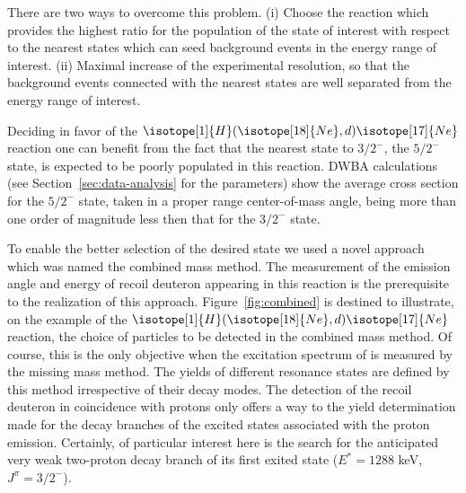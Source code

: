 \documentclass[superscriptaddress,showpacs,showkeys,twoside,floatfix,twocolumn]
{revtex4-1}
\begin{document}
There are two ways to overcome this problem.
(i) Choose the reaction which provides the highest ratio for the population of
the state of interest with respect to the nearest states which can seed
background events in the energy range of interest.
(ii) Maximal increase of the experimental resolution,
so that the background events connected with the nearest states
are well separated from the energy range of interest.

Deciding in favor of the
\(\isotope[1]{H}(\isotope[18]{Ne},d)\isotope[17]{Ne}\) reaction
one can benefit from the fact that the nearest state to $3/2^-$,
the $5/2^-$ state, is expected to be poorly populated
in this reaction.
DWBA calculations (see Section~\ref{sec:data-analysis} for the parameters)
show the average cross section for the $5/2^-$ state,
taken in a proper range center-of-mass angle,
being more than one order of magnitude
less then that for the $3/2^-$ state.

To enable the better selection of the desired  state
we used a novel approach which was named the combined mass method.
The measurement of the emission angle and energy of recoil deuteron appearing
in this reaction is the prerequisite to the realization of this approach.
Figure~\ref{fig:combined} is destined to illustrate, on the example of
the \(\isotope[1]{H}(\isotope[18]{Ne},d)\isotope[17]{Ne}\) reaction,
the choice of particles to be detected in the combined mass method.
Of course, this is the only objective when the excitation spectrum
of  is measured by the missing mass method.
The yields of different resonance states are defined by this method
irrespective of their decay modes.
The detection of the recoil deuteron in coincidence with protons only offers
a way to the yield determination made for the decay branches of
the  excited states associated with the proton emission.
Certainly, of particular interest here is the search for the anticipated
very weak two-proton decay branch of its first exited state
(\(E^*=1288\) keV, \(J^{\pi}=3/2^-\)).
\end{document}
